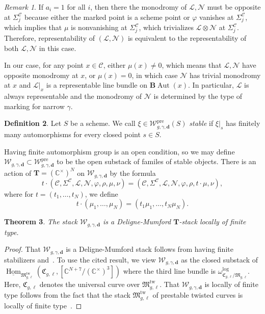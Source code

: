 \documentclass{amsart}
\newtheorem{thm}{Theorem}[section]
\theoremstyle{definition}
\newtheorem{defn}[thm]{Definition}
\theoremstyle{remark}
\newtheorem{rmk}[thm]{Remark}
\theoremstyle{plain}
\theoremstyle{definition}
\theoremstyle{remark}
\newcommand{\C}{\mathbb{C}}
\newcommand{\T}{\mathbf{T}}
\newcommand{\mc}[1]{\mathcal{#1}}
\newcommand{\mf}[1]{\mathfrak{#1}}
\newcommand{\mbf}[1]{\mathbf{#1}}
\newcommand{\mr}[1]{\mathrm{#1}}
\newcommand{\ul}[1]{\underline{#1}}
\newcommand{\1}{\mathbf{1}}
\newcommand{\2}{\mathbf{2}}
\newcommand{\3}{\mathbf{3}}
\newcommand{\pre}{\mr{pre}}
\DeclareMathOperator{\Hom}{Hom}
\DeclareMathOperator{\Aut}{Aut}
\begin{document}
\begin{rmk}
If $a_i = 1$ for all $i$, then there the monodromy of $\mc{L}, \mc{N}$ must be opposite at $\Sigma_j^{\mc{C}}$ because either the marked point is a scheme point or $\varphi$ vanishes at $\Sigma_j^{\mc{C}}$, which implies that $\mu$ is nonvanishing at $\Sigma_j^{\mc{C}}$, which trivializes $\mc{L} \otimes \mc{N}$ at $\Sigma_j^{\mc{C}}$. Therefore, representability of $(\mc{L}, \mc{N})$ is equivalent to the representability of both $\mc{L}, \mc{N}$ in this case.

    In our case, for any point $x \in \mc{C}$, either $\mu(x) \neq 0$, which means that $\mc{L}, \mc{N}$ have opposite monodromy at $x$, or $\mu(x) = 0$, in which case $\mc{N}$ has trivial monodromy at $x$ and $\mc{L}|_x$ is a representable line bundle on $\mathbf{B}\!\Aut(x)$. In particular, $\mc{L}$ is always representable and the monodromy of $\mc{N}$ is determined by the type of marking for narrow $\gamma$.
\end{rmk}

\begin{defn}
  Let $S$ be a scheme. We call $\xi \in \mc{W}_{g,\gamma,\mbf{d}}^{\pre}(S)$ \textit{stable} if $\xi|_s$ has finitely many automorphisms for every closed point $s \in S$.
\end{defn}

Having finite automorphism group is an open condition, so we may define $\mc{W}_{g,\gamma,\mbf{d}} \subset \mc{W}_{g,\gamma,\mbf{d}}^{\pre}$ to be the open substack of familes of stable objects. There is an action of $\T = (\C^{\times})^N$ on $\mc{W}_{g,\gamma,\mbf{d}}$ by the formula
\[ t \cdot (\mc{C}, \Sigma^{\mc{C}}, \mc{L}, \mc{N}, \varphi, \rho, \mu, \nu) =(\mc{C}, \Sigma^{\mc{C}}, \mc{L}, \mc{N}, \varphi, \rho, t \cdot \mu, \nu), \]
where for $t = (t_1, \ldots, t_N)$, we define
\[ t \cdot (\mu_1, \ldots, \mu_N) = (t_1 \mu_1, \ldots, t_N \mu_N). \]

\begin{thm}
The stack $\mc{W}_{g,\gamma,\mbf{d}}$ is a Deligne-Mumford $\T$-stack locally of finite type.
\end{thm}

\begin{proof}
  That $\mc{W}_{g,\gamma,\mbf{d}}$ is a Deligne-Mumford stack follows from having finite stabilizers and~\cite[Lemma 2.8]{orbqmap}. To use the cited result, we view $\mc{W}_{g,\gamma,\mbf{d}}$ as the closed substack of $\ul{\Hom}_{\mf{M}_{g,\ell}^{\mr{tw}}}(\mf{C}_{g,\ell}, [\C^{N+7}/(\C^{\times})^3])$ where the third line bundle is $\omega_{\mf{C}_{g,\ell}/\mf{M}_{g,\ell}}^{\log}$. Here, $\mf{C}_{g,\ell}$ denotes the universal curve over $\mf{M}^{\mr{tw}}_{g,\ell}$. That $\mc{W}_{g,\gamma,\mbf{d}}$ is locally of finite type follows from the fact that the stack $\mf{M}_{g,\ell}^{\mr{tw}}$ of prestable twisted curves is locally of finite type~\cite[Corollary 1.12]{logtwcurves}.
\end{proof}
\end{document}
